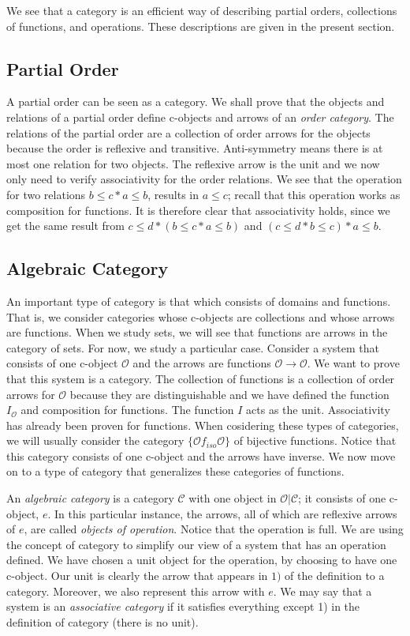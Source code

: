 \documentclass [12pt]{book}
\begin{document}
We see that a category is an efficient way of describing partial orders, collections of functions, and operations. These descriptions are given in the present section.

		\subsection{Partial Order}

A partial order can be seen as a category. We shall prove that the objects and relations of a partial order define c-objects and arrows of an \textit{order category}. The relations of the partial order are a collection of order arrows for the objects because the order is reflexive and transitive. Anti-symmetry means there is at most one relation for two objects. The reflexive arrow is the unit and we now only need to verify associativity for the order relations. We see that the operation for two relations $b\leq c*a\leq b$, results in $a\leq c$; recall that this operation works as composition for functions. It is therefore clear that associativity holds, since we get the same result  from $c\leq d*(b\leq c*a\leq b)$ and $(c\leq d*b\leq c)*a\leq b$.

		\subsection{Algebraic Category}

An important type of category is that which consists of domains and functions. That is, we consider categories whose c-objects are collections and whose arrows are functions. When we study sets, we will see that functions are arrows in the category of sets. For now, we study a particular case. Consider a system that consists of one c-object $\mathcal O$ and the arrows are functions $\mathcal O\rightarrow\mathcal O$. We want to prove that this system is a category. The collection of functions is a collection of order arrows for $\mathcal O$ because they are distinguishable and we have defined the function $I_\mathcal O$ and composition for functions. The function $I$ acts as the unit. Associativity has already been proven for functions. When cosidering these types of categories, we will usually consider the category $\{\mathcal Of_{iso}\mathcal O\}$ of bijective functions. Notice that this category consists of one c-object and the arrows have inverse. We now move on to a type of category that generalizes these categories of functions.

An \textit{algebraic category} is a category $\mathcal{C}$ with one object in $\mathcal{O|C}$; it consists of one c-object, $e$. In this particular instance, the arrows, all of which are reflexive arrows of $e$, are called \textit{objects of operation}. Notice that the operation is full. We are using the concept of category to simplify our view of a system that has an operation defined. We have chosen a unit object for the operation, by choosing to have one c-object. Our unit is clearly the arrow that appears in $1)$ of the definition to a category. Moreover, we also represent this arrow with $e$. We may say that a system is an \textit{associative category} if it satisfies everything except 1) in the definition of category (there is no unit).
\end{document}
